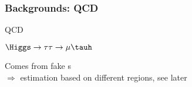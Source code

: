 \begin{frame}
\frametitle{Backgrounds: QCD}

\begin{minipage}[c]{.45\textwidth}
\begin{block}{QCD\vphantom{ÀQj}}
\begin{center}
\end{center}
\end{block}
\end{minipage}
\hfill
\begin{minipage}[c]{.45\textwidth}
\begin{block}{$\Higgs\to\tau\tau\to\mu\tauh$\vphantom{ÀQj}}
\begin{center}
\end{center}
\end{block}
\end{minipage}

\begin{block}{}
Comes from fake \tauh s\\
$\Rightarrow$ estimation based on different regions, see later
\end{block}

\end{frame}